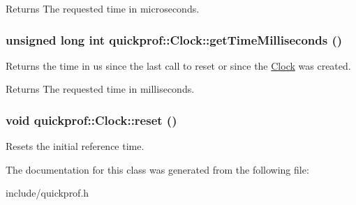 \begin{DoxyReturn}{Returns}
The requested time in microseconds. 
\end{DoxyReturn}
\hypertarget{classquickprof_1_1_clock_a0b751b8c42d2c86e82b3199b6039794a}{
\subsubsection[{getTimeMilliseconds}]{\setlength{\rightskip}{0pt plus 5cm}unsigned long int quickprof::Clock::getTimeMilliseconds ()}}
\label{classquickprof_1_1_clock_a0b751b8c42d2c86e82b3199b6039794a}
Returns the time in us since the last call to reset or since the \hyperlink{classquickprof_1_1_clock}{Clock} was created.

\begin{DoxyReturn}{Returns}
The requested time in milliseconds. 
\end{DoxyReturn}
\hypertarget{classquickprof_1_1_clock_a22b4d38f4562efd7f624a70efdb1add4}{
\subsubsection[{reset}]{\setlength{\rightskip}{0pt plus 5cm}void quickprof::Clock::reset ()}}
\label{classquickprof_1_1_clock_a22b4d38f4562efd7f624a70efdb1add4}
Resets the initial reference time. 

The documentation for this class was generated from the following file:\begin{DoxyCompactItemize}
\item 
include/quickprof.h\end{DoxyCompactItemize}
